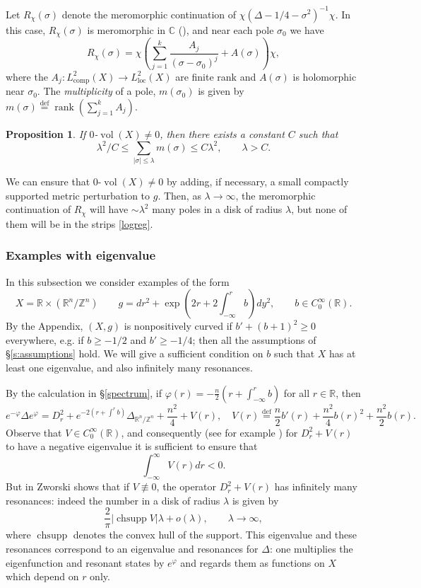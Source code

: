 \documentclass[reqno, 12pt]{amsart}
\newcommand \R {\mathbb{R}}
\newcommand \C {\mathbb{C}}
\newcommand \Z {\mathbb{Z}}
\newcommand \Def {\stackrel{\textrm{def}}=}
\DeclareMathOperator \chsupp {chsupp}
\DeclareMathOperator \rank {rank}
\DeclareMathOperator \vol {vol}
\newtheorem{prop}{Proposition}
\theoremstyle{definition}
\numberwithin{equation}{section}
\numberwithin{prop}{section}
\numberwithin{figure}{section}
\begin{document}
Let $R_\chi(\sigma)$ denote the meromorphic continuation of $\chi (\Delta - 1/4 - \sigma^2)^{-1} \chi$. In this case, $R_\chi(\sigma)$ is meromorphic in $\C$ (\cite{mm, gz}), and near each pole $\sigma_0$ we have
\[R_\chi(\sigma) = \chi \left(\sum_{j=1}^k \frac {A_j}{(\sigma - \sigma_0)^j} + A(\sigma)\right) \chi,\]
where the $A_j\colon L^2_{\textrm{comp}}(X) \to L^2_{\textrm{loc}}(X)$  are finite rank  and $A(\sigma)$ is holomorphic near $\sigma_0$. The \emph{multiplicity} of a pole, $m(\sigma_0)$ is given by $m(\sigma) \Def \rank\left(\sum_{j=1}^k A_j\right).$
\begin{prop}\cite[Theorem 1.3]{gz}
If $0$-$\vol(X) \ne 0$, then there exists a constant $C$ such that
\[\lambda^2/C \le \sum_{|\sigma|\le \lambda}m(\sigma) \le C\lambda^2, \qquad \lambda > C.\]
\end{prop}
We can ensure that $0$-$\vol(X) \ne 0$ by adding, if necessary, a small compactly supported metric perturbation to $g$. Then, as $\lambda \to \infty$, the meromorphic continuation of $R_\chi$ will have $\sim \lambda^2$ many poles in a disk of radius $\lambda$, but none of them will be in the strips \eqref{logreg}.

\subsubsection{Examples with eigenvalue}\label{exeigensec}
In this subsection we  consider examples of the form
\begin{equation}\label{exampeigen}X = \R \times (\R^n \slash  \Z^n) \qquad g = dr^2+ \exp \left(2r + 2\int_{-\infty}^r b\right)dy^2, \qquad b \in C_0^\infty(\R).\end{equation}
By  the Appendix, $(X,g)$ is  nonpositively curved if $b' + (b + 1)^2 \ge 0$ everywhere, e.g. if $b \ge -1/2$ and $b' \ge -1/4$; then all the assumptions of \S \ref{s:assumptions} hold. We will give a sufficient condition on $b$ such that $X$ has at least one eigenvalue, and also infinitely many resonances.

By the calculation in \S\ref{spectrum}, if $\varphi(r)=- \frac n 2\left( r +  \int_{-\infty}^r b\right)$ for all $r \in \R$,
then
\[e^{-\varphi} \Delta e^{\varphi} = D_r^2 + e^{-2(r + \int^r b)} \Delta_{\R^n/\Z^n} + \frac{n^2} 4 + V(r), \quad V(r) \Def  \frac n 2 b'(r) + \frac {n^2} 4 b(r)^2 + \frac {n^2} 2 b(r).\]
Observe that $V \in C_0^\infty(\R)$, and consequently (see for example \cite[Theorem XIII.110]{rs}) for $D_r^2 + V(r)$ to have a negative eigenvalue it is sufficient to ensure that
\[\int_{-\infty}^\infty  V(r)dr <  0.\]
But in \cite[Theorem 2]{z87} Zworski shows that if $V \not\equiv 0$, the operator $D_r^2 + V(r)$ has infinitely many resonances: indeed the number in a disk of radius $\lambda$ is given by 
\[\frac 2 \pi |\chsupp V| \lambda + o(\lambda),\qquad \lambda \to \infty,\]
where $\chsupp$ denotes the convex hull of the support. This eigenvalue and these resonances correspond to an eigenvalue and resonances for $\Delta$:  one multiplies the eigenfunction and resonant states by $e^{\varphi}$ and regards them as functions on $X$ which depend on  $r$ only.
\end{document}
